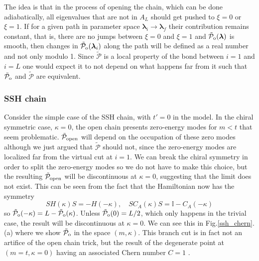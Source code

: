 \documentclass[twocolumn,amsmath,longbibliography,amssymb,superscriptaddress]{revtex4-1}
\newcommand{\tpo}{\tilde{\mathcal{P}}_{\rm o}}
\begin{document}
The idea is that in the process of opening the chain, which can be done adiabatically, all eigenvalues that are not in $A_L$ should get pushed to $\xi=0$ or $\xi=1$. 
If for a given path in parameter space $\boldsymbol{\lambda}_i \rightarrow \boldsymbol{\lambda}_f$ their contribution remains constant, that is, there are no jumps between $\xi=0$ and $\xi=1$ and $\tpo (\boldsymbol{\lambda} )$ is smooth, then changes in $\tpo(\boldsymbol{\lambda}_i ) $ along the path will be defined as a real number and not only modulo 1. Since $\tilde{\mathcal{P}}$ is a local property of the bond between $i=1$ and $i=L$ one would expect it to not depend on what happens far from it such that $\tpo$ and $\tilde{\mathcal{P}}$ are equivalent. 

\subsubsection{SSH chain}

Consider the simple case of the SSH chain, with $t'=0$ in the model. In the chiral symmetric case, $\kappa = 0$, the open chain presents zero-energy modes for $m<t$ that seem problematic. $\tilde{\mathcal{P}}_{\rm open}$  will depend on the occupation of these zero modes although we just argued that $\tilde{\mathcal{P}}$ should not, since the zero-energy modes are localized far from the virtual cut at $i=1$. We can break the chiral symmetry in order to split the zero-energy modes so we do not have to make this choice, but the resulting $\tilde{\mathcal{P}}_{\rm open}$ will be discontinuous at $\kappa = 0$, suggesting that the limit does not exist. This can be seen from the fact that the Hamiltonian now has the symmetry
\begin{equation}
SH(\kappa)S = -H(-\kappa), \quad S C_A(\kappa) S = \mathbb{I}-C_A(-\kappa)
\end{equation}
so $\tpo(-\kappa) = L-\tpo(\kappa)$. Unless $\tpo(0) = L/2$, which only happens in the trivial case, the result will be discontinuous at $\kappa = 0$. We can see this in Fig.\ref{ssh_chern}.(a) where we show $\tpo$ in the space $(m,\kappa)$. This branch cut is in fact not an artifice of the open chain trick, but the result of the degenerate point at $(m=t,\kappa=0)$ having an associated Chern number $C=1$ \cite{Asboth2016}.
\end{document}
